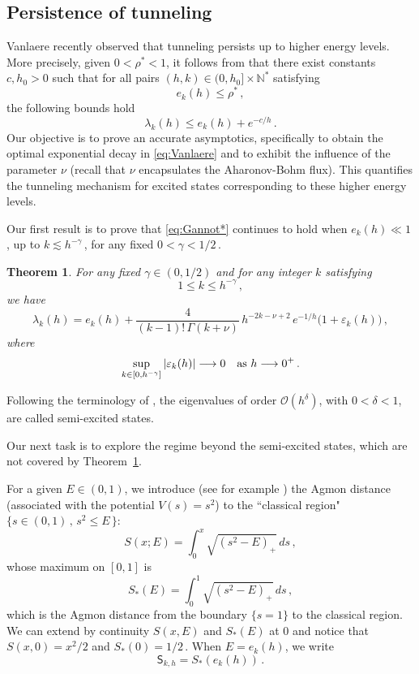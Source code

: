 \documentclass[11pt]{amsart}
\numberwithin{equation}{section}
\newtheorem{theorem}{Theorem}[section]
\theoremstyle{remark}
\newcommand{\mn}{\medskip\noindent}
\begin{document}
\subsection{Persistence of tunneling}
Vanlaere recently observed that  tunneling persists up to higher energy levels. More precisely, given $0<\rho^*<1$, it follows from \cite[Theorem~1.4]{Vanlaere}  that there exist
 constants $c,h_0>0$ such that for all pairs $(h,k) \in (0,h_0]\times \mathbb N^*$ satisfying
\[ e_k(h)\leq \rho^*\,,\]
the following bounds hold
\begin{equation}\label{eq:Vanlaere}
\lambda_k(h)\leq e_k(h)+e^{-c/h}\,.
\end{equation}
%
%
 Our objective is to prove an accurate asymptotics, specifically to obtain  the optimal exponential decay in \eqref{eq:Vanlaere} and to exhibit  the influence of the parameter $\nu$ (recall that $\nu$ encapsulates the Aharonov-Bohm flux). This quantifies the tunneling mechanism for excited states corresponding to these higher energy levels.


Our first result is to prove that \eqref{eq:Gannot*}
 continues to hold when
$e_k(h)\ll 1\,$, up to $k\lesssim h^{-\gamma}\,$, for any fixed
$0<\gamma<1/2\,$.


\begin{theorem}\label{thm:ext-Gannot}
For any fixed $\gamma\in(0,1/2)$ 
and for any integer $k$ satisfying
\[
1\leq k\leq 
h^{-\gamma}\,, 
\]
we have
\[\lambda_k(h)=e_k(h)+\frac{4}
{(k-1)!\,\Gamma(k+\nu)}\,h^{-2k-\nu+2}\,
e^{-1/h}
\bigl(1+\varepsilon_k(h)\bigr)\,,\]
where
\[\sup_{k\in[0, h^{-\gamma}]}|\varepsilon_k(h)|\longrightarrow 0\quad\text{as $h\longrightarrow0^+$\,.}\] 
\end{theorem} 
Following the terminology of \cite{Sj}, the eigenvalues of order $\mathcal O(h^\delta)$, with $ 0<\delta<1$, are called semi-excited states. 

\mn
Our next task is to explore the regime beyond the semi-excited states, which are not covered by Theorem~\ref{thm:ext-Gannot}.

\mn
For a given $ E\in (0,1)$, we introduce (see for example \cite{He,HS}) the Agmon distance (associated with the potential $V(s)=s^2$) to the ``classical  region" $\{s\in (0,1)\,,\, s^2 \leq E\,\}$:
\begin{equation}\label{eq:def-Agmon}
S(x;E)=\int_0^x\sqrt{(s^2-E)_+}\,ds\,,
\end{equation}
whose maximum on $[0,1]$ is
\begin{equation}\label{eq:S-tunneling}
S_*(E)=\int_0^1\sqrt{(s^2-E)_+}\,ds\,,
\end{equation}
which is the Agmon distance from the boundary $\{s=1\}$ to the classical region.
 We can extend by continuity $S(x,E)$ and $S_*(E)$ at $0$ and notice that $S(x,0)= x^2/2$ and  $S_*(0)=1/2\,$.
%
\mn
When $E=e_k(h)$, we write
\[\mathsf S_{k,h}=S_*(e_k(h))\,.\]
\end{document}
